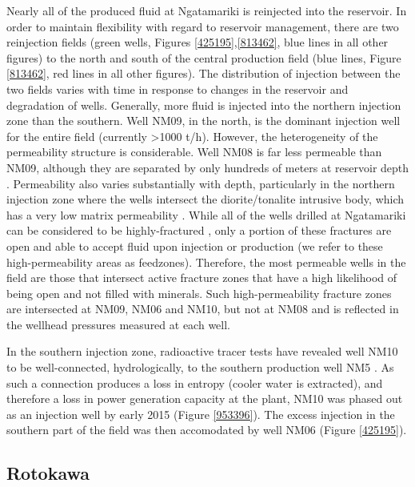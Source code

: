Nearly all of the produced fluid at Ngatamariki is reinjected into the reservoir. In order to maintain flexibility with regard to reservoir management, there are two reinjection fields (green wells, Figures \ref{425195},\ref{813462}, blue lines in all other figures) to the north and south of the central production field (blue lines, Figure \ref{813462}, red lines in all other figures). The distribution of injection between the two fields varies with time in response to changes in the reservoir and degradation of wells. Generally, more fluid is injected into the northern injection zone than the southern. Well NM09, in the north, is the dominant injection well for the entire field (currently \textgreater1000 t/h). However, the heterogeneity of the permeability structure is considerable. Well NM08 is far less permeable than NM09, although they are separated by only hundreds of meters at reservoir depth \citep{Clearwater_2015}. Permeability also varies substantially with depth, particularly in the northern injection zone where the wells intersect the diorite\slash{tonalite} intrusive body, which has a very low matrix permeability \citep{Cant_2018}. While all of the wells drilled at Ngatamariki can be considered to be highly-fractured \citep{nm09_report,nm10_report,massiot_2012}, only a portion of these fractures are open and able to accept fluid upon injection or production (we refer to these high-permeability areas as feedzones). Therefore, the most permeable wells in the field are those that intersect active fracture zones that have a high likelihood of being open and not filled with minerals. Such high-permeability fracture zones are intersected at NM09, NM06 and NM10, but not at NM08 \citep{nm09_report,nm10_report,massiot_2012} and is reflected in the wellhead pressures measured at each well.

In the southern injection zone, radioactive tracer tests have revealed well NM10 to be well-connected, hydrologically, to the southern production well NM5 \citep{buscarlet_2015}. As such a connection produces a loss in entropy (cooler water is extracted), and therefore a loss in power generation capacity at the plant, NM10 was phased out as an injection well by early 2015 (Figure \ref{953396}). The excess injection in the southern part of the field was then accomodated by well NM06 (Figure \ref{425195}).

\subsection{Rotokawa}
